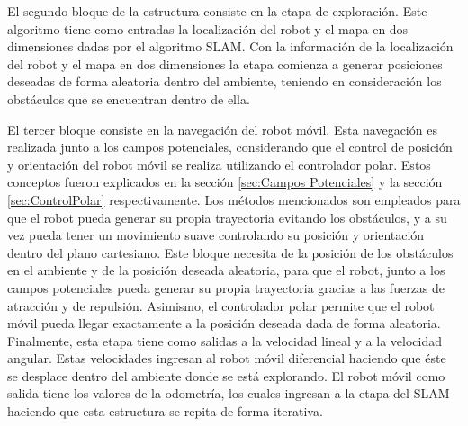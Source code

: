 
El segundo bloque de la estructura consiste en la etapa de exploración. Este algoritmo tiene 
como entradas la localización del robot y el mapa en dos dimensiones dadas por el algoritmo
SLAM. Con la información de la localización del robot y el mapa en dos dimensiones la etapa 
comienza a generar posiciones deseadas de forma aleatoria dentro del ambiente, teniendo en 
consideración los obstáculos que se encuentran dentro de ella. 

El tercer bloque consiste en la navegación del robot móvil. Esta navegación es realizada 
junto a los campos potenciales, considerando que el control de posición y orientación del 
robot móvil se realiza utilizando el controlador polar. Estos conceptos fueron explicados 
en la sección \ref{sec:Campos Potenciales} y la sección \ref{sec:ControlPolar} 
respectivamente. Los métodos mencionados son empleados para que el robot pueda generar su 
propia trayectoria evitando los obstáculos, y a su vez pueda tener un movimiento suave 
controlando su posición y orientación dentro del plano cartesiano. Este bloque necesita 
de la posición de los obstáculos en el ambiente y de la posición deseada aleatoria, para 
que el robot, junto a los campos potenciales pueda generar su propia trayectoria gracias 
a las fuerzas de atracción y de repulsión. Asimismo, el controlador polar permite que el 
robot móvil pueda llegar exactamente a la posición deseada dada de forma 
aleatoria. Finalmente, esta etapa tiene como salidas a la velocidad lineal y a la velocidad 
angular. Estas velocidades ingresan al robot móvil diferencial haciendo que éste se desplace 
dentro del ambiente donde se está explorando. El robot móvil como salida tiene los valores 
de la odometría, los cuales ingresan a la etapa del SLAM haciendo que esta estructura se 
repita de forma iterativa.

